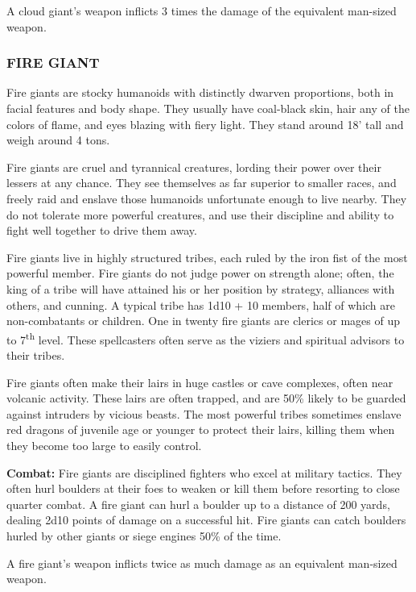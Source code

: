 \begin{multicols}{2}
A cloud giant's weapon inflicts 3 times the damage of the equivalent man-sized weapon.

\subsubsection{FIRE GIANT}

Fire giants are stocky humanoids with distinctly dwarven proportions, both in facial features and body shape. They usually have coal-black skin, hair any of the colors of flame, and eyes blazing with fiery light. They stand around 18' tall and weigh around 4 tons.

Fire giants are cruel and tyrannical creatures, lording their power over their lessers at any chance. They see themselves as far superior to smaller races, and freely raid and enslave those humanoids unfortunate enough to live nearby. They do not tolerate more powerful creatures, and use their discipline and ability to fight well together to drive them away.

Fire giants live in highly structured tribes, each ruled by the iron fist of the most powerful member. Fire giants do not judge power on strength alone; often, the king of a tribe will have attained his or her position by strategy, alliances with others, and cunning. A typical tribe has 1d10 + 10 members, half of which are non-combatants or children. One in twenty fire giants are clerics or mages of up to 7\textsuperscript{th} level. These spellcasters often serve as the viziers and spiritual advisors to their tribes.

Fire giants often make their lairs in huge castles or cave complexes, often near volcanic activity. These lairs are often trapped, and are 50\% likely to be guarded against intruders by vicious beasts. The most powerful tribes sometimes enslave red dragons of juvenile age or younger to protect their lairs, killing them when they become too large to easily control.

\textbf{Combat:} Fire giants are disciplined fighters who excel at military tactics. They often hurl boulders at their foes to weaken or kill them before resorting to close quarter combat. A fire giant can hurl a boulder up to a distance of 200 yards, dealing 2d10 points of damage on a successful hit. Fire giants can catch boulders hurled by other giants or siege engines 50\% of the time.

A fire giant's weapon inflicts twice as much damage as an equivalent man-sized weapon.


\end{multicols}
